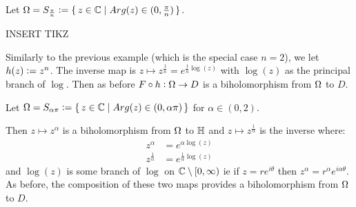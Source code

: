 \begin{example}
Let $\Omega = S_{\frac{\pi}{n}} \vcentcolon = \set{ z \in \mathbb{C}\mid Arg(z) \in (0, \frac{\pi}{n} ) }$.

INSERT TIKZ

Similarly to the previous example (which is the special case $n=2$), we let $h(z) \vcentcolon = z^n$. The inverse map is $z \mapsto z^\frac{1}{n} = e^{\frac{1}{n} \log(z)}$ with $\log(z)$ as the principal branch of $\log$. Then as before $F \circ h : \Omega \to D$ is a biholomorphism from $\Omega$ to $D$.

\end{example}

\begin{example}
Let $\Omega = S_{\alpha \pi} \vcentcolon = \set{ z \in \mathbb{C}\mid Arg(z) \in (0, \alpha \pi ) }$ for $\alpha \in (0,2) $.

Then $z \mapsto z^\alpha$ is a biholomorphism from $\Omega$ to $\mathbb{H}$ and $z \mapsto z^\frac{1}{\alpha}$ is the inverse where:
\begin{align*}
    z^\alpha &= e^{\alpha \log(z)}\\
    z^{\frac{1}{\alpha}} &= e^{ \frac{1}{\alpha} \log(z)}
\end{align*}
and $\log(z)$ is some branch of $\log$ on $\mathbb{C} \setminus [0, \infty)$ ie if $z = re^{i \theta}$ then $z^\alpha = r^\alpha e ^{i \alpha \theta}$. As before, the composition of these two maps provides a biholomorphism from $\Omega$ to $D$.
\end{example}

